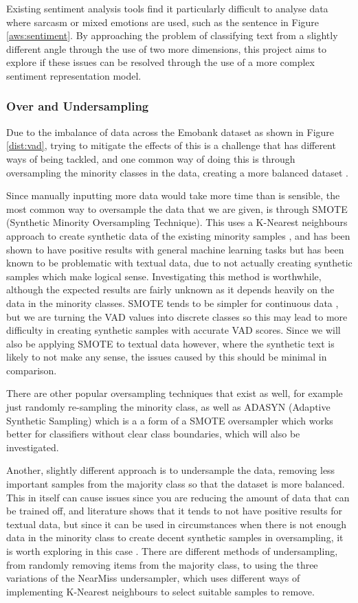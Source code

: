 Existing sentiment analysis tools find it particularly difficult to analyse data where sarcasm or mixed emotions are used, such as the sentence in Figure \ref{aws:sentiment}. By approaching the problem of classifying text from a slightly different angle through the use of two more dimensions, this project aims to explore if these issues can be resolved through the use of a more complex sentiment representation model.

\subsubsection{Over and Undersampling}

Due to the imbalance of data across the Emobank dataset as shown in Figure \ref{dist:vad}, trying to mitigate the effects of this is a challenge that has different ways of being tackled, and one common way of doing this is through oversampling the minority classes in the data, creating a more balanced dataset \cite{towardsDS}.

Since manually inputting more data would take more time than is sensible, the most common way to oversample the data that we are given, is through SMOTE (Synthetic Minority Oversampling Technique). This uses a K-Nearest neighbours approach to create synthetic data of the existing minority samples , and has been shown to have positive results with general machine learning tasks but has been known to be problematic with textual data, due to not actually creating synthetic samples which make logical sense. Investigating this method is worthwhile, although the expected results are fairly unknown as it depends heavily on the data in the minority classes. SMOTE tends to be simpler for continuous data \cite{chawla2002smote}, but we are turning the VAD values into discrete classes so this may lead to more difficulty in creating synthetic samples with accurate VAD scores. Since we will also be applying SMOTE to textual data however, where the synthetic text is likely to not make any sense, the issues caused by this should be minimal in comparison. 

There are other popular oversampling techniques that exist as well, for example just randomly re-sampling the minority class, as well as ADASYN (Adaptive Synthetic Sampling) which is a a form of a SMOTE oversampler which works better for classifiers without clear class boundaries, which will also be investigated.

Another, slightly different approach is to undersample the data, removing less important samples from the majority class so that the dataset is more balanced. This in itself can cause issues since you are reducing the amount of data that can be trained off, and literature shows that it tends to not have positive results for textual data, but since it can be used in circumstances when there is not enough data in the minority class to create decent synthetic samples in oversampling, it is worth exploring in this case \cite{more2016survey}. There are different methods of undersampling, from randomly removing items from the majority class, to using the three variations of the NearMiss undersampler, which uses different ways of implementing K-Nearest neighbours to select suitable samples to remove. 

